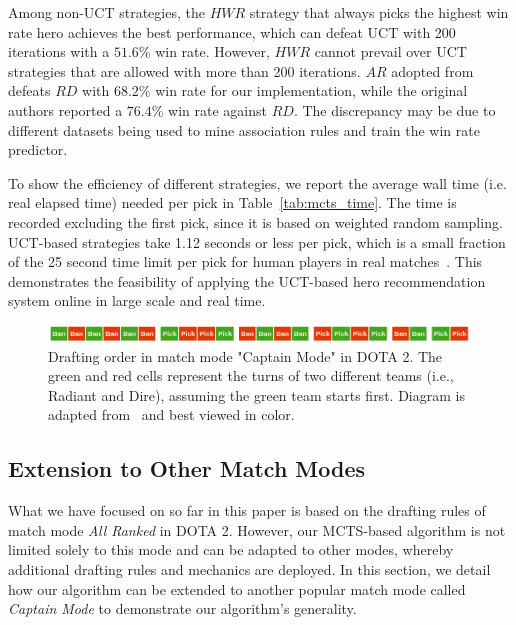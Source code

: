 Among non-UCT strategies, the $HWR$ strategy that always picks the highest win rate hero achieves the best performance, which can defeat UCT with 200 iterations with a $51.6\%$ win rate. However, $HWR$ cannot prevail over UCT strategies that are allowed with more than 200 iterations. $AR$ adopted from~\cite{hanke2017reco} defeats $RD$ with $68.2\%$ win rate for our implementation, while the original authors reported a $76.4\%$ win rate against $RD$. The discrepancy may be due to different datasets being used to mine association rules and train the win rate predictor.

To show the efficiency of different strategies, we report the average wall time (i.e. real elapsed time) needed per pick in Table~\ref{tab:mcts_time}. The time is recorded excluding the first pick, since it is based on weighted random sampling. UCT-based strategies take 1.12 seconds or less per pick, which is a small fraction of the 25 second time limit per pick for human players in real matches~\cite{dotapickorder}. This demonstrates the feasibility of applying the UCT-based hero recommendation system online in large scale and real time.



\begin{figure}
\centering
\includegraphics[width=1\textwidth]{Figures/pickorder_captain_mode.png}
\caption{Drafting order in match mode "Captain Mode" in DOTA 2. The green and red cells represent the turns of two different teams (i.e., Radiant and Dire), assuming the green team starts first. Diagram is adapted from~\cite{dotapickorder} and best viewed in color.}
\label{fig:pickorder_captain_mode}
\end{figure}

\subsection{Extension to Other Match Modes}\label{sec:draftart_extension}
What we have focused on so far in this paper is based on the drafting rules of match mode \textit{All Ranked} in DOTA 2. However, our MCTS-based algorithm is not limited solely to this mode and can be adapted to other modes, whereby additional drafting rules and mechanics are deployed. In this section, we detail how our algorithm can be extended to another popular match mode called \textit{Captain Mode} to demonstrate our algorithm's generality. 

